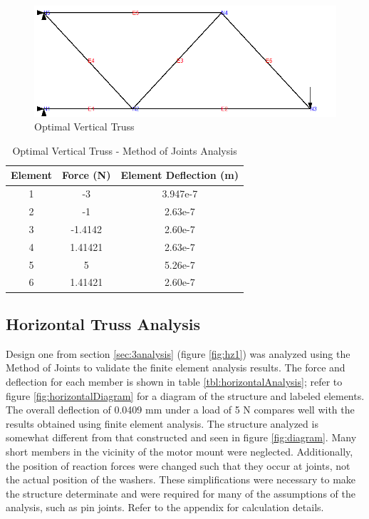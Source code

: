 \begin{figure}[p]
    \centering
    \includegraphics[width=.80\textwidth]{images/truss5_given}
    \caption{Optimal Vertical Truss}
    \label{fig:truss5_given}
\end{figure}

\begin{table}[p]
	\centering
	\caption{Optimal Vertical Truss - Method of Joints Analysis}
	\label{tbl:indeterm_5}
	\vspace{6pt}
	\begin{tabular}{ccc}
		\toprule
		Element & Force (N) & Element Deflection (m) \\
		\midrule
		1 &  -3 &  3.947e-7 \\
		2 &  -1 & 2.63e-7 \\
		3 &  -1.4142 &   2.60e-7 \\
		4 &  1.41421 &  2.63e-7 \\
		5 &  5 & 5.26e-7 \\
		6 &  1.41421 &  2.60e-7 \\ 
		\bottomrule
	\end{tabular}
\end{table}


\subsection{Horizontal Truss Analysis}
\label{sec:IDontCare}

Design one from section \ref{sec:3analysis} (figure \ref{fig:hz1}) was analyzed using the Method of Joints to validate the finite element analysis results.
The force and deflection for each member is shown in table \ref{tbl:horizontalAnalysis}; refer to figure \ref{fig:horizontalDiagram} for a diagram of the structure and labeled elements.
The overall deflection of 0.0409 mm under a load of 5 N compares well with the results obtained using finite element analysis.
The structure analyzed is somewhat different from that constructed and seen in figure \ref{fig:diagram}.
Many short members in the vicinity of the motor mount were neglected.
Additionally, the position of reaction forces were changed such that they occur at joints, not the actual position of the washers.
These simplifications were necessary to make the structure determinate and were required for many of the assumptions of the analysis, such as pin joints.
Refer to the appendix for calculation details.

